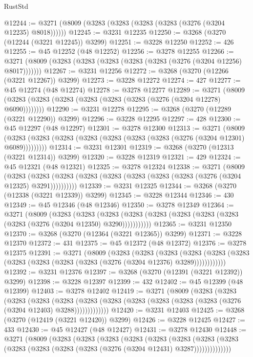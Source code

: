 \begin{lexlean}{RustStd}
\begin{coremodule}
{\begin{coremodule}
{{{{{{{{{{{{{{{{{{{{{{{{{{{{{{{{{{{{{@12244 := @3271 (@8009 (@3283 (@3283 (@3283 (@3283 (@3276 (@3204 @12235) @8018))))))
@12245 := @3231 @12235
@12250 := @3268 (@3270 (@12244 (@3221 @12245)) @3299)
@12251 := @3228 @12250
@12252 := 426
@12255 := @45 @12252 (@48 @12252)
@12256 := @3278 @12255
@12266 := @3271 (@8009 (@3283 (@3283 (@3283 (@3283 (@3283 (@3276 (@3204 @12256) @8017)))))))
@12267 := @3231 @12256
@12272 := @3268 (@3270 (@12266 (@3221 @12267)) @3299)
@12273 := @3228 @12272
@12274 := 427
@12277 := @45 @12274 (@48 @12274)
@12278 := @3278 @12277
@12289 := @3271 (@8009 (@3283 (@3283 (@3283 (@3283 (@3283 (@3283 (@3276 (@3204 @12278) @6090))))))))
@12290 := @3231 @12278
@12295 := @3268 (@3270 (@12289 (@3221 @12290)) @3299)
@12296 := @3228 @12295
@12297 := 428
@12300 := @45 @12297 (@48 @12297)
@12301 := @3278 @12300
@12313 := @3271
    (@8009 (@3283 (@3283 (@3283 (@3283 (@3283 (@3283 (@3283 (@3276 (@3204 @12301) @6089)))))))))
@12314 := @3231 @12301
@12319 := @3268 (@3270 (@12313 (@3221 @12314)) @3299)
@12320 := @3228 @12319
@12321 := 429
@12324 := @45 @12321 (@48 @12321)
@12325 := @3278 @12324
@12338 := @3271
    (@8009
      (@3283 (@3283 (@3283 (@3283 (@3283 (@3283 (@3283 (@3283 (@3276 (@3204 @12325) @3291))))))))))
@12339 := @3231 @12325
@12344 := @3268 (@3270 (@12338 (@3221 @12339)) @3299)
@12345 := @3228 @12344
@12346 := 430
@12349 := @45 @12346 (@48 @12346)
@12350 := @3278 @12349
@12364 := @3271
    (@8009
      (@3283
        (@3283
          (@3283 (@3283 (@3283 (@3283 (@3283 (@3283 (@3283 (@3276 (@3204 @12350) @3290)))))))))))
@12365 := @3231 @12350
@12370 := @3268 (@3270 (@12364 (@3221 @12365)) @3299)
@12371 := @3228 @12370
@12372 := 431
@12375 := @45 @12372 (@48 @12372)
@12376 := @3278 @12375
@12391 := @3271
    (@8009
      (@3283
        (@3283
          (@3283
            (@3283 (@3283 (@3283 (@3283 (@3283 (@3283 (@3283 (@3276 (@3204 @12376) @3289))))))))))))
@12392 := @3231 @12376
@12397 := @3268 (@3270 (@12391 (@3221 @12392)) @3299)
@12398 := @3228 @12397
@12399 := 432
@12402 := @45 @12399 (@48 @12399)
@12403 := @3278 @12402
@12419 := @3271
    (@8009
      (@3283
        (@3283
          (@3283
            (@3283
              (@3283
                (@3283 (@3283 (@3283 (@3283 (@3283 (@3283 (@3276 (@3204 @12403) @3288)))))))))))))
@12420 := @3231 @12403
@12425 := @3268 (@3270 (@12419 (@3221 @12420)) @3299)
@12426 := @3228 @12425
@12427 := 433
@12430 := @45 @12427 (@48 @12427)
@12431 := @3278 @12430
@12448 := @3271
    (@8009
      (@3283
        (@3283
          (@3283
            (@3283
              (@3283
                (@3283
                  (@3283
                    (@3283 (@3283 (@3283 (@3283 (@3283 (@3276 (@3204 @12431) @3287))))))))))))))
}}}}}}}}}}}}}}}}}}}}}}}}}}}}}}}}}}}}}
\end{coremodule}}
\end{coremodule}
\end{lexlean}
